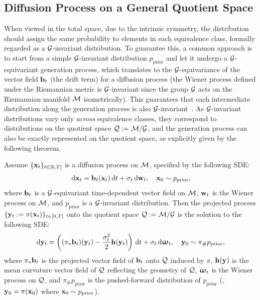 \documentclass{article} %
\newcommand{\prior}{\mathrm{prior}}
\begin{document}
\subsection{Diffusion Process on a General Quotient Space} \label{sec:framework}
When viewed in the total space, due to the intrinsic symmetry, the distribution should assign the same probability to elements in each equivalence class, formally regarded as a $\mathcal{G}$-invariant distribution. 
To guarantee this, a common approach is to start from a simple $\mathcal{G}$-invariant distribution $p_\prior$ and let it undergo a $\mathcal{G}$-equivariant generation process, which translates to the $\mathcal{G}$-equivariance of the vector field $\mathbf{b}_t$ (the drift term) for a diffusion process (the Wiener process defined under the Riemannian metric is $\mathcal{G}$-invariant since the group $\mathcal{G}$ acts on the Riemannian manifold $\mathcal{M}$ isometrically).
This guarantees that each intermediate distribution along the generation process is also $\mathcal{G}$-invariant~\citep{kohler2020equivariant,hoogeboom2022equivariant}.
As $\mathcal{G}$-invariant distributions vary only \emph{across} equivalence classes, they correspond to distributions on the quotient space $\mathcal{Q} := \mathcal{M}/\mathcal{G}$, and the generation process can also be exactly represented on the quotient space, as explicitly given by the following theorem.
\begin{theorem}\label{thm:projected-diffusion}
\vspace{-2pt}
  Assume $\{\mathbf{x}_t\}_{t\in[0,T]}$ is a diffusion process on $\mathcal{M}$, specified by the following SDE:
  \begin{align}\label{eqn:original-sde}
    \ud \bfxx_t = \bfbb_t(\bfxx_t) \ud t + \sigma_t \ud \bfww_t,\quad \bfxx_0\sim p_\prior,
  \end{align}
  where $\mathbf{b}_t$ is a $\mathcal{G}$-equivariant time-dependent vector field on $\mathcal{M}$, $\mathbf{w}_t$ is the Wiener process on $\mathcal{M}$, %
  and $p_\prior$ is a $\mathcal{G}$-invariant distribution.
  Then the projected process $\{\mathbf{y}_t:=\pi(\mathbf{x}_t)\}_{t\in[0,T]}$ onto the quotient space $\mathcal{Q} := \mathcal{M}/\mathcal{G}$ is the solution to the following SDE:
  \begin{align}\label{eqn:projected-sde}
    \dd\bfyy_t = \left( (\pi_*\bfbb_t)(\bfyy_t) - \frac{\sigma_t^2}{2} \bfhh(\bfyy_t) \right) \ud t + \sigma_t \ud \bfomega_t, \quad \bfyy_0 \sim \pi_{\#}p_\prior,
  \end{align}
  where $\pi_*\mathbf{b}_t$ is the projected %
  vector field of $\mathbf{b}_t$ onto $\mathcal{Q}$ induced by $\pi$, $\mathbf{h}(\mathbf{y})$ is the mean curvature vector field of $\mathcal{Q}$ reflecting the geometry of $\mathcal{Q}$,
  ${\bm{\upomega}}_t$ is the Wiener process on $\mathcal{Q}$,
  and $\pi_{\#}p_\prior$ is the pushed-forward distribution of $p_\prior$ (\ie, $\mathbf{y}_0 = \pi(\mathbf{x}_0)$ where $\bfxx_0 \sim p_\prior$).
  \vspace{-2pt}
\end{theorem}
\end{document}
